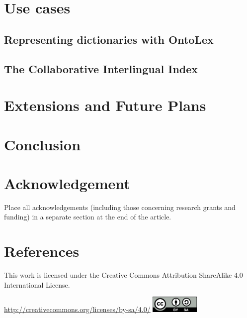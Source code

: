 \documentclass[12pt,a4paper]{elex2017}
\begin{document}
\section{Use cases}

\subsection{Representing dictionaries with OntoLex}

\subsection{The Collaborative Interlingual Index}

\section{Extensions and Future Plans}

\section{Conclusion}

\section*{Acknowledgement} 

Place all acknowledgements (including those concerning research grants and
funding) in a separate section at the end of the article.

\section*{References}

\printbibliography[
    type={book},
    notkeyword={dictionary},
    title={Books}
]
\printbibliography[
    type={incollection},
    title={Book Sections}
]
\printbibliography[
    type={inproceedings},
    title={Paper in conference proceedings}
]
\printbibliography[
    type={article},
    title={Journal Articles}
]
\printbibliography[
    type={misc},
    title={Technical Reports}
]
\printbibliography[
    type={book},
    keyword={dictionary},
    title={Dictionaries}
]


\medskip
\begin{minipage}[t]{\textwidth}
    \noindent This work is licensed under the Creative Commons Attribution
    ShareAlike 4.0 International License.
    \vspace{-2ex}
    \begin{center}%
        \url{http://creativecommons.org/licenses/by-sa/4.0/}\linebreak
        \includegraphics[width=2.33cm]{cc.png}%
    \end{center}
\end{minipage}
\end{document}
